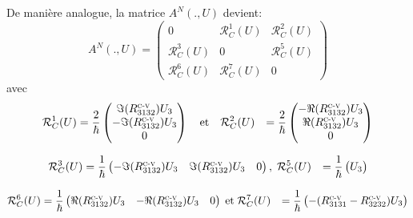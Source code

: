 \documentclass[12pt,a4paper,openany,oneside]{book}
\begin{document}
{{{{{{De manière analogue, la matrice $ A^{N}(.,U)$ devient:
$$
A^{N}(.,U)=
\begin{pmatrix}
0 & \mathcal{R}^{1}_{C}(U) & \mathcal{R}^{2}_{C}(U)\\
\mathcal{R}^{3}_{C}(U) & 0 & \mathcal{R}^{5}_{C}(U) \\
\mathcal{R}^{6}_{C}(U) & \mathcal{R}^{7}_{C}(U)& 0
\end{pmatrix}
$$
avec 
 \begin{eqnarray*}
 \begin{split}
\mathcal{R}^{1}_{C}(U) &= \dfrac{2}{\hbar}
\begin{pmatrix}
\Im(R^{\textsc{c-v}}_{3132})U_{3}\\
-\Im(R^{\textsc{c-v}}_{3132})U_{3}\\
            0 
\end{pmatrix} \quad \textrm{et} \quad
\mathcal{R}^{2}_{C}(U) &= \dfrac{2}{\hbar}
\begin{pmatrix}
-\Re(R^{\textsc{c-v}}_{3132})U_{3}\\
\Re(R^{\textsc{c-v}}_{3132})U_{3}\\
             0
\end{pmatrix}
\end{split}
\end{eqnarray*}

\begin{eqnarray*}
\begin{split}
\mathcal{R}^{3}_{C}(U)&= \dfrac{1}{\hbar}
\begin{pmatrix}
-\Im(R^{\textsc{c-v}}_{3132})U_{3} & \Im(R^{\textsc{c-v}}_{3132})U_{3} & 0
\end{pmatrix}, \; 
\mathcal{R}^{5}_{C}(U)&= \dfrac{1}{\hbar}
\begin{pmatrix}
U_{3} 
\end{pmatrix}
\end{split}
\end{eqnarray*}

\begin{eqnarray*}
\begin{split}
\mathcal{R}^{6}_{C}(U)&= \dfrac{1}{\hbar}
\begin{pmatrix}
\Re(R^{\textsc{c-v}}_{3132})U_{3} & -\Re(R^{\textsc{c-v}}_{3132})U_{3} & 0 
\end{pmatrix}\; \textrm{et} \;
\mathcal{R}^{7}_{C}(U)&= \dfrac{1}{\hbar}
\begin{pmatrix} -(R^{\textsc{c-v}}_{3131}-R^{\textsc{c-v}}_{3232})U_{3} \end{pmatrix} 
\end{split}
\end{eqnarray*}

}}}}}}
\end{document}
